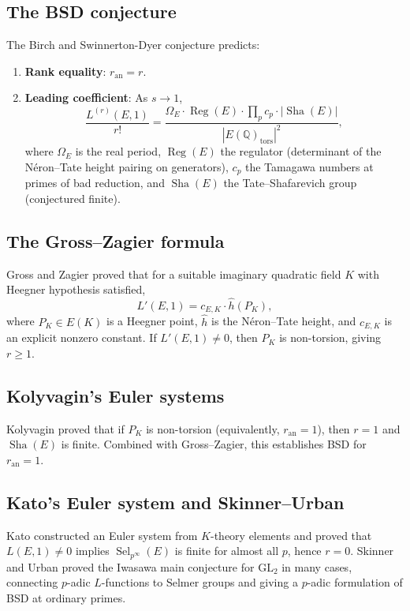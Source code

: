 \documentclass[11pt]{article}
\DeclareMathOperator{\Reg}{Reg}
\DeclareMathOperator{\Sha}{Sha}
\DeclareMathOperator{\Sel}{Sel}
\begin{document}
\subsection{The BSD conjecture}

The Birch and Swinnerton-Dyer conjecture \cite{BSD} predicts:
\begin{enumerate}
  \item[(BSD-I)] \textbf{Rank equality}: $r_{\mathrm{an}} = r$.
  \item[(BSD-II)] \textbf{Leading coefficient}: As $s \to 1$,
    \[
      \frac{L^{(r)}(E,1)}{r!} =
      \frac{\Omega_E \cdot \Reg(E) \cdot \prod_p c_p \cdot |\Sha(E)|}
           {|E(\mathbb{Q})_{\mathrm{tors}}|^2},
    \]
    where $\Omega_E$ is the real period, $\Reg(E)$ the regulator (determinant of
    the N\'eron--Tate height pairing on generators), $c_p$ the Tamagawa numbers
    at primes of bad reduction, and $\Sha(E)$ the Tate--Shafarevich group
    (conjectured finite).
\end{enumerate}

\subsection{The Gross--Zagier formula}

Gross and Zagier \cite{GZ} proved that for a suitable imaginary quadratic field
$K$ with Heegner hypothesis satisfied,
\[
  L'(E,1) = c_{E,K} \cdot \hat{h}(P_K),
\]
where $P_K \in E(K)$ is a Heegner point, $\hat{h}$ is the N\'eron--Tate height,
and $c_{E,K}$ is an explicit nonzero constant.  If $L'(E,1) \neq 0$, then $P_K$
is non-torsion, giving $r \geq 1$.

\subsection{Kolyvagin's Euler systems}

Kolyvagin \cite{Koly} proved that if $P_K$ is non-torsion (equivalently,
$r_{\mathrm{an}} = 1$), then $r = 1$ and $\Sha(E)$ is finite.  Combined with
Gross--Zagier, this establishes BSD for $r_{\mathrm{an}} = 1$.

\subsection{Kato's Euler system and Skinner--Urban}

Kato \cite{Kato} constructed an Euler system from $K$-theory elements and proved
that $L(E,1) \neq 0$ implies $\Sel_{p^\infty}(E)$ is finite for almost all $p$,
hence $r = 0$.  Skinner and Urban \cite{SU} proved the Iwasawa main conjecture
for $\mathrm{GL}_2$ in many cases, connecting $p$-adic $L$-functions to Selmer
groups and giving a $p$-adic formulation of BSD at ordinary primes.
\end{document}
